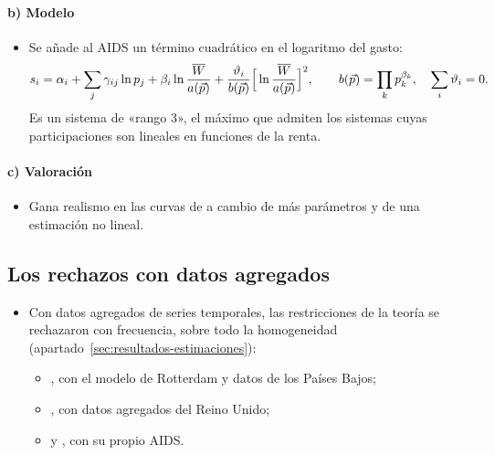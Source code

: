 \documentclass[11pt]{article}
\begin{document}
\paragraph{b) Modelo}

\begin{itemize}
\item Se añade al AIDS un término cuadrático en el logaritmo del gasto:
  \begin{equation}
  s_i=\alpha_i+\sum_j\gamma_{ij}\ln p_j+\beta_i\ln\frac{\overline{W}}{a(\vec{p})}+\frac{\vartheta_i}{b(\vec{p})}\Big[\ln\frac{\overline{W}}{a(\vec{p})}\Big]^2,\qquad b(\vec{p})=\prod_kp_k^{\beta_k},\quad\sum_i\vartheta_i=0. \label{eq:quaids}
  \end{equation}
  Es un sistema de «rango 3», el máximo que admiten los sistemas cuyas participaciones son lineales en funciones de la renta\nocite{Gorman1981Engel}.
\end{itemize}

\paragraph{c) Valoración}

\begin{itemize}
\item Gana realismo en las curvas de  a cambio de más parámetros y de una estimación no lineal.
\end{itemize}

\subsection{Los rechazos con datos agregados}\label{anexo:rechazos}

\begin{itemize}
\item Con datos agregados de series temporales, las restricciones de la teoría se rechazaron con frecuencia, sobre todo la homogeneidad (apartado~\ref{sec:resultados-estimaciones}):
  \begin{itemize}
  \item \textcite{Barten1967Slutsky,Barten1969Maximum}, con el modelo de Rotterdam y datos de los Países Bajos;
  \item \textcite{Deaton1974Analysis}, con datos agregados del Reino Unido;
  \item y \textcite{DeatonMuellbauer1980AIDS}, con su propio AIDS.
  \end{itemize}
\end{itemize}
\end{document}
